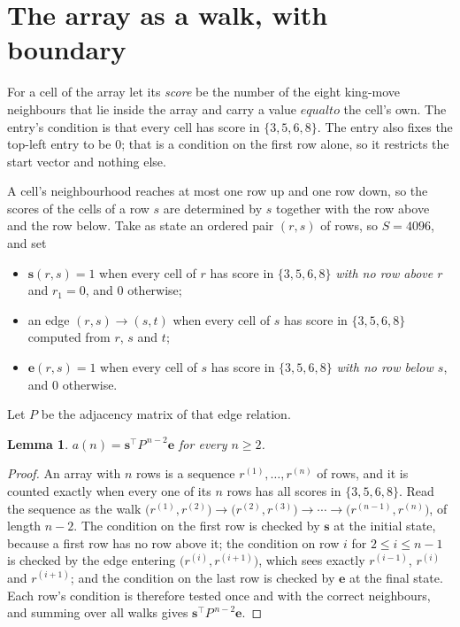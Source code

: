 \documentclass[11pt,a4paper]{article}
\theoremstyle{plain}
\newtheorem{lemma}[theorem]{Lemma}
\theoremstyle{definition}
\begin{document}
\section{The array as a walk, with boundary}

For a cell of the array let its \emph{score} be the number of the eight king-move neighbours that lie inside
the array and carry a value $equal to$ the cell's own. The entry's condition is that every cell
has score in $\{3,5,6,8\}$. The entry also fixes the top-left entry to be $0$; that is a condition on the first row alone, so it restricts the start vector and nothing else.

A cell's neighbourhood reaches at most one row up and one row down, so the scores of the
cells of a row $s$ are determined by $s$ together with the row above and the row below.
Take as state an ordered pair $(r,s)$ of rows, so $S=4096$, and set
\begin{itemize}
\item $\mathbf{s}(r,s)=1$ when every cell of $r$ has score in $\{3,5,6,8\}$ \emph{with no row
above $r$} and $r_1=0$, and $0$ otherwise;
\item an edge $(r,s)\to(s,t)$ when every cell of $s$ has score in $\{3,5,6,8\}$ computed from
$r$, $s$ and $t$;
\item $\mathbf{e}(r,s)=1$ when every cell of $s$ has score in $\{3,5,6,8\}$ \emph{with no row
below $s$}, and $0$ otherwise.
\end{itemize}
Let $P$ be the adjacency matrix of that edge relation.

\begin{lemma}\label{lem:walk}
$a(n)=\mathbf{s}^{\!\top}P^{\,n-2}\mathbf{e}$ for every $n\ge2$.
\end{lemma}

\begin{proof}
An array with $n$ rows is a sequence $r^{(1)},\dots,r^{(n)}$ of rows, and it is counted
exactly when every one of its $n$ rows has all scores in $\{3,5,6,8\}$. Read the sequence as the
walk $\bigl(r^{(1)},r^{(2)}\bigr)\to\bigl(r^{(2)},r^{(3)}\bigr)\to\cdots\to
\bigl(r^{(n-1)},r^{(n)}\bigr)$, of length $n-2$. The condition on the first row is
checked by $\mathbf{s}$ at the initial state, because a first row has no row above it; the
condition on row $i$ for $2\le i\le n-1$ is checked by the edge entering
$\bigl(r^{(i)},r^{(i+1)}\bigr)$, which sees exactly $r^{(i-1)}$, $r^{(i)}$ and
$r^{(i+1)}$; and the condition on the last row is checked by $\mathbf{e}$ at the final
state. Each row's condition is therefore tested once and with the correct neighbours, and
summing over all walks gives $\mathbf{s}^{\!\top}P^{\,n-2}\mathbf{e}$.
\end{proof}
\end{document}
